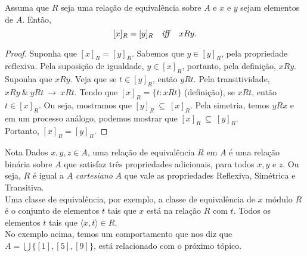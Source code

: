          \begin{theorem}
            Assuma que $R$ seja uma relação de equivalência sobre $A$ e $x$ e $y$ sejam elementos de $A$.
            Então,
            $$[x]_{R} = [y]_{R}\quad \textrm{\textit{iff}}\quad xRy.$$
         \end{theorem}
         \begin{proof}
            Suponha que $[x]_{R} = [y]_{R}$. Sabemos que $y \in [y]_{R}$, pela propriedade reflexiva. Pela suposição de igualdade, $y \in [x]_{R}$, portanto, pela definição, $xRy$.
            Suponha que $xRy$. Veja que se $t \in [y]_{R}$, então $yRt$. Pela transitividade, $xRy\ \&\ yRt\ \rightarrow\ xRt$.
            Tendo que $[x]_{R} = \{t: xRt\}$ (definição), se $xRt$, então $t \in [x]_{R}$. Ou seja, mostramos que $[y]_{R}\ \subseteq\ [x]_{R}$.
            Pela simetria, temos $yRx$ e em um processo análogo, podemos mostrar que $[x]_{R}\ \subseteq\ [y]_{R}$.\\
            Portanto, $[x]_{R} = [y]_{R}$.
         \end{proof}
         \begin{mymdframed}{Nota}  
            Dados $x,y,z \in A$, uma relação de equivalência $R$ em $A$ é uma relação binária sobre $A$ que satisfaz três propriedades adicionais, para todos $x, y$ e $z$. Ou seja, $R$ é igual a $A$ \textit{cartesiano} $A$ que vale as propriedades Reflexiva, Simétrica e Transitiva.\\
            Uma classe de equivalência, por exemplo, a classe de equivalência de $x$ módulo $R$ é o conjunto de elementos $t$ tais que $x$ está na relação $R$ com $t$. Todos os elementos $t$ tais que $\langle x, t \rangle \in R$.\\
            No exemplo acima, temos um comportamento que nos diz que $A = \bigcup\{[1], [5], [9]\}$, está relacionado com o próximo tópico.
         \end{mymdframed}

